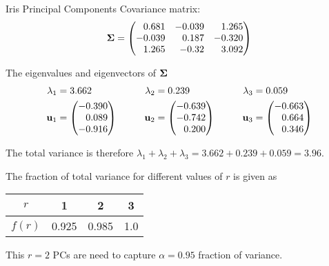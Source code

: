\begin{frame}{Iris Principal Components}
Covariance matrix:
    \begin{align*}
        \cov = \amatr{r}{
        0.681 &-0.039 &1.265\\
        -0.039& 0.187 &-0.320\\
        1.265 &-0.32 &3.092\\
        }
    \end{align*}
	
	\medskip
    The eigenvalues and eigenvectors of ${\bm \Sigma}$
    \begin{alignat*}{3}
    \lambda_1 & = 3.662 &\qquad\lambda_2 &= 0.239 &\qquad\lambda_3 &= 0.059\\
        \bu_1 &= \amatr{r}{-0.390\\0.089\\-0.916} &\bu_2 &= \amatr{r}{-0.639\\-0.742\\0.200} &\bu_3 &= \amatr{r}{-0.663\\0.664\\0.346}
    \end{alignat*}

    The total variance is therefore $\lambda_1 + \lambda_2 +
    \lambda_3  = 3.662  +0.239 + 0.059 = 3.96$.

	The fraction of total variance for different values of $r$ is
    given as
    \begin{center}
    \vspace*{12pt plus2pt minus1pt}
    {\renewcommand{\arraystretch}{1.1}\begin{tabular}{|c||c|c|c|}
        \hline
        $r$ & 1 & 2 & 3\\
        \hline
        $f(r)$ & 0.925 & 0.985 & 1.0\\
        \hline
    \end{tabular}}
        \vspace*{12pt plus2pt minus1pt}
    \end{center}
	This $r=2$ PCs are need to capture $\alpha=0.95$ fraction of
	variance.

\end{frame}



